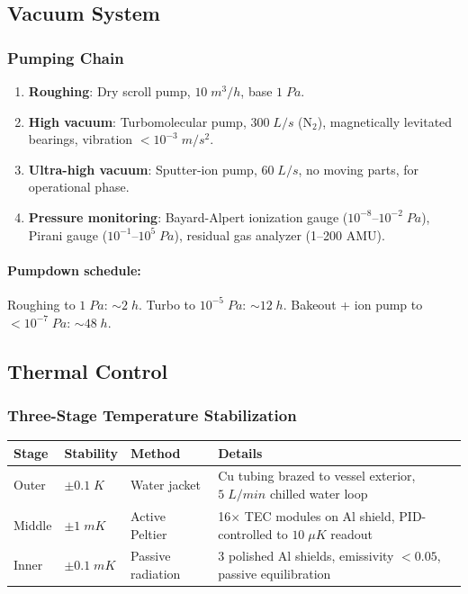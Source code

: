 \documentclass[11pt,a4paper]{article}
\begin{document}
\subsection{Vacuum System}

\subsubsection{Pumping Chain}

\begin{enumerate}[nosep]
\item \textbf{Roughing}: Dry scroll pump, $10\;\si{m^3/h}$,
base $1\;\si{Pa}$.
\item \textbf{High vacuum}: Turbomolecular pump, $300\;\si{L/s}$
(N$_2$), magnetically levitated bearings, vibration
$< 10^{-3}\;\si{m/s^2}$.
\item \textbf{Ultra-high vacuum}: Sputter-ion pump, $60\;\si{L/s}$,
no moving parts, for operational phase.
\item \textbf{Pressure monitoring}: Bayard-Alpert ionization gauge
($10^{-8}$--$10^{-2}\;\si{Pa}$), Pirani gauge
($10^{-1}$--$10^5\;\si{Pa}$), residual gas analyzer
(1--200 AMU).
\end{enumerate}

\paragraph{Pumpdown schedule:}
Roughing to $1\;\si{Pa}$: $\sim 2\;\si{h}$.
Turbo to $10^{-5}\;\si{Pa}$: $\sim 12\;\si{h}$.
Bakeout + ion pump to $< 10^{-7}\;\si{Pa}$: $\sim 48\;\si{h}$.

\subsection{Thermal Control}

\subsubsection{Three-Stage Temperature Stabilization}

\begin{longtable}{p{}p{}p{}p{}}
\toprule
\textbf{Stage} & \textbf{Stability} & \textbf{Method} & \textbf{Details} \\
\midrule
\endhead
Outer & $\pm 0.1\;\si{K}$ & Water jacket & Cu tubing brazed to vessel exterior,
$5\;\si{L/min}$ chilled water loop \\
Middle & $\pm 1\;\si{mK}$ & Active Peltier & 16$\times$ TEC modules on Al shield,
PID-controlled to $10\;\si{\mu K}$ readout \\
Inner & $\pm 0.1\;\si{mK}$ & Passive radiation & 3 polished Al shields,
emissivity $< 0.05$, passive equilibration \\
\bottomrule
\end{longtable}
\end{document}

